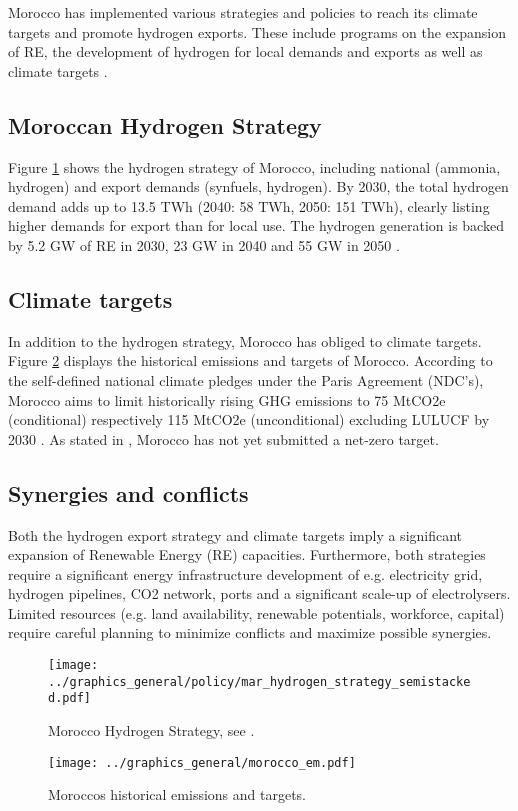 Morocco has implemented various strategies and policies to reach its climate targets and promote hydrogen exports. These include programs on the expansion of RE, the development of hydrogen for local demands and exports as well as climate targets \cite{MarHyStrat2021, CAT2021}.


\subsection{Moroccan Hydrogen Strategy}
Figure \ref{fig:mar_hydrogen_strategy} shows the hydrogen strategy of Morocco, including
national (ammonia, hydrogen) and export demands (synfuels, hydrogen).
By 2030, the total hydrogen demand adds up to 13.5 TWh (2040: 58 TWh, 2050: 151 TWh), 
clearly listing higher demands for export than for local use. The hydrogen generation is backed by 5.2 GW of RE in 2030, 23 GW in 2040 and 55 GW in 2050 \cite{MarHyStrat2021}.

\subsection{Climate targets}
In addition to the hydrogen strategy, Morocco has obliged to climate targets.
Figure \ref{fig:morocco_em} displays the historical emissions and targets of Morocco.
According to the self-defined national climate pledges under the Paris Agreement (NDC's), Morocco aims to limit historically rising GHG emissions to 75 MtCO2e (conditional) respectively 115 MtCO2e (unconditional) excluding LULUCF by 2030 \cite{CAT2021}. 
As stated in \cite{CAT2021}, Morocco has not yet submitted a net-zero target. 

\subsection{Synergies and conflicts}
Both the hydrogen export strategy and climate targets imply a significant expansion of Renewable Energy (RE) capacities. Furthermore, both strategies require a significant energy infrastructure development of e.g. electricity grid, hydrogen pipelines, CO2 network, ports and a significant scale-up of electrolysers.
Limited resources (e.g. land availability, renewable potentials, workforce, capital) require careful planning to minimize conflicts and maximize possible synergies.

\begin{figure}
    \centering
    \texttt{[image: ../graphics\_general/policy/mar\_hydrogen\_strategy\_semistacked.pdf]}
    \caption{Morocco Hydrogen Strategy, see \cite{MarHyStrat2021}.}
    \label{fig:mar_hydrogen_strategy}
\end{figure}


\begin{figure}[h!]
    \centering
    \texttt{[image: ../graphics\_general/morocco\_em.pdf]}
    \caption{Moroccos historical emissions and targets.}
    \label{fig:morocco_em}
\end{figure}
